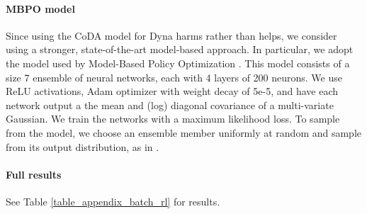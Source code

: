 \documentclass[coda.tex]{subfiles}
\begin{document}
\paragraph{MBPO model}

Since using the CoDA model for Dyna harms rather than helps, we consider using a stronger, state-of-the-art model-based approach. In particular, we adopt the model used by Model-Based Policy Optimization \cite{janner2019trust}. This model consists of a size 7 ensemble of neural networks, each with 4 layers of 200 neurons. We use ReLU activations, Adam optimizer \cite{kingma2014adam} with weight decay of 5e-5, and have each network output a the mean and (log) diagonal covariance of a multi-variate Gaussian. We train the networks with a maximum likelihood loss. To sample from the model, we choose an ensemble member uniformly at random and sample from its output distribution, as in \cite{janner2019trust}. 

\paragraph{Full results}

See Table \ref{table_appendix_batch_rl} for results.
\end{document}
